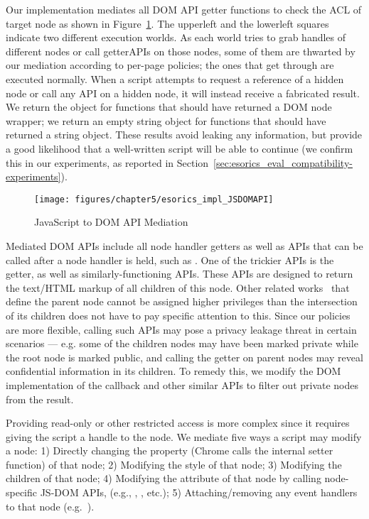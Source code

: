 Our implementation mediates all DOM API getter functions to check the ACL of target node as shown in Figure~\ref{fig:esorics_impl_JSDOMAPI}.  The upperleft and the lowerleft squares indicate two different execution worlds.  As each world tries to grab handles of different nodes or call getterAPIs on those nodes, some of them are thwarted by our mediation according to per-page policies;  the ones that get through are executed normally.  When a script attempts to request a reference of a hidden node or call any API on a hidden node, it will instead receive a fabricated result.  We return the  object for functions that should have returned a DOM node wrapper;  we return an empty string object for functions that should have returned a string object.  These results avoid leaking any information, but provide a good likelihood that a well-written script will be able to continue (we confirm this in our experiments, as reported in Section~\ref{sec:esorics_eval_compatibility-experiments}). 

\begin{figure}[hbt]
\centering
\texttt{[image: figures/chapter5/esorics\_impl\_JSDOMAPI]}
\caption{JavaScript to DOM API Mediation}
\label{fig:esorics_impl_JSDOMAPI}
\end{figure}

Mediated DOM APIs include all node handler getters as well as APIs that can be called after a node handler is held, such as .  One of the trickier APIs is the  getter, as well as similarly-functioning APIs.  These APIs are designed to return the text/HTML markup of all children of this node.  Other related works~\cite{Adjail,MashupOS} that define the parent node cannot be assigned higher privileges than the intersection of its children does not have to pay specific attention to this.  Since our policies are more flexible, calling such APIs may pose a privacy leakage threat in certain scenarios --- e.g. some of the children nodes may have been marked private while the root node is marked public, and calling the  getter on parent nodes may reveal confidential information in its children.  To remedy this, we modify the DOM implementation of the  callback and other similar APIs to filter out private nodes from the result.  

 Providing read-only or other restricted access is more complex since it requires giving the script a handle to the node.  We mediate five ways a script may modify a node:
1) Directly changing the property (Chrome calls the internal setter function) of that node; 
2) Modifying the style of that node; 
3) Modifying the children of that node; 
4) Modifying the attribute of that node by calling node-specific JS-DOM APIs, (e.g., , , etc.); 
5) Attaching/removing any event handlers to that node (e.g.~).

